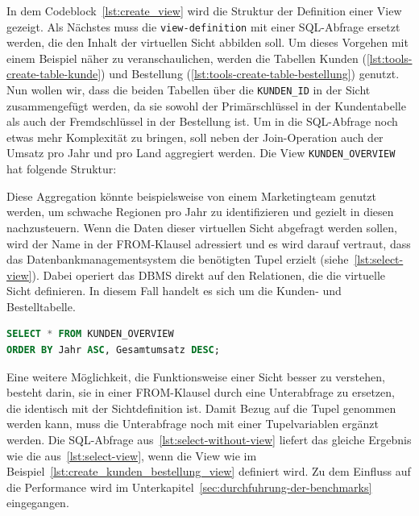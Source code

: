 In dem Codeblock~\ref{lst:create_view} wird die Struktur der Definition einer View gezeigt.
Als Nächstes muss die \texttt{view-definition} mit einer SQL-Abfrage ersetzt werden, die den Inhalt der virtuellen Sicht abbilden soll.
Um dieses Vorgehen mit einem Beispiel näher zu veranschaulichen, werden die Tabellen Kunden (\ref{lst:tools-create-table-kunde}) und Bestellung (\ref{lst:tools-create-table-bestellung}) genutzt.
Nun wollen wir, dass die beiden Tabellen über die \texttt{KUNDEN\_ID} in der Sicht zusammengefügt werden, da sie sowohl der Primärschlüssel in der Kundentabelle als auch der Fremdschlüssel in der Bestellung ist.
Um in die SQL-Abfrage noch etwas mehr Komplexität zu bringen, soll neben der Join-Operation auch der Umsatz pro Jahr und pro Land aggregiert werden.
Die View \texttt{KUNDEN\_OVERVIEW} hat folgende Struktur:

\vspace{-5pt}


Diese Aggregation könnte beispielsweise von einem Marketingteam genutzt werden, um schwache Regionen pro Jahr zu identifizieren und gezielt in diesen nachzusteuern.
Wenn die Daten dieser virtuellen Sicht abgefragt werden sollen, wird der Name in der FROM-Klausel adressiert und es wird darauf vertraut, dass das Datenbankmanagementsystem die benötigten Tupel erzielt (siehe~\ref{lst:select-view}).
Dabei operiert das DBMS direkt auf den Relationen, die die virtuelle Sicht definieren.
In diesem Fall handelt es sich um die Kunden- und Bestelltabelle.

\vspace{-5pt}
\begin{lstlisting}[language=SQL,caption=SQL-Befehl mit verwendeter View,label={lst:select-view}]
SELECT * FROM KUNDEN_OVERVIEW
ORDER BY Jahr ASC, Gesamtumsatz DESC;
\end{lstlisting}
\vspace{-5pt}

Eine weitere Möglichkeit, die Funktionsweise einer Sicht besser zu verstehen, besteht darin, sie in einer FROM-Klausel durch eine Unterabfrage zu ersetzen, die identisch mit der Sichtdefinition ist.
Damit Bezug auf die Tupel genommen werden kann, muss die Unterabfrage noch mit einer Tupelvariablen ergänzt werden.
Die SQL-Abfrage aus~\ref{lst:select-without-view} liefert das gleiche Ergebnis wie die aus~\ref{lst:select-view}, wenn die View wie im Beispiel~\ref{lst:create_kunden_bestellung_view} definiert wird.
Zu dem Einfluss auf die Performance wird im Unterkapitel~\ref{sec:durchfuhrung-der-benchmarks} eingegangen.

